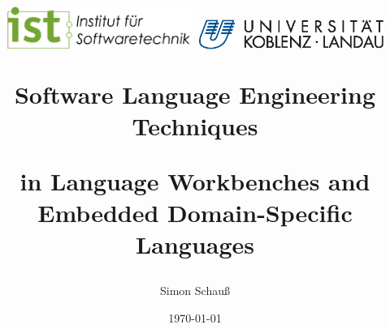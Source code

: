 \title{
	\includegraphics[width=0.45\textwidth, keepaspectratio]{institute-logo.eps}
	\includegraphics[width=0.45\textwidth, keepaspectratio]{university-logo.eps}
	\begin{center}
		\Huge{
			Software Language Engineering Techniques 
		}
	\end{center}
	\begin{center}
		\Large{
			in Language Workbenches and Embedded Domain-Specific Languages
		}
	\end{center}
}
\date{
	\small{
		\today
	}
}
\author{Simon Schauß}

\maketitle
